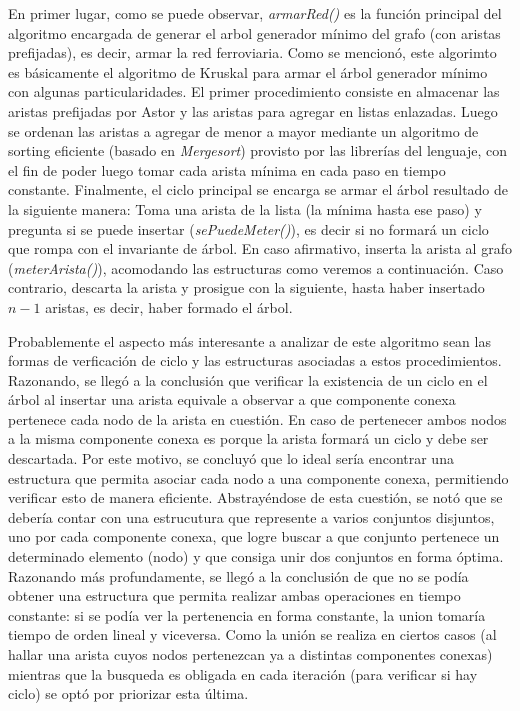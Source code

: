 \documentclass[a4paper,11pt] {article}
\begin{document}
En primer lugar, como se puede observar, \textit{armarRed()} es la función principal del algoritmo encargada de generar el arbol generador mínimo del grafo (con aristas prefijadas), es decir, armar la red ferroviaria. Como se mencionó, este algorimto es básicamente el algoritmo de Kruskal para armar el árbol generador mínimo con algunas particularidades. El primer procedimiento consiste en almacenar las aristas prefijadas por Astor y las aristas para agregar en listas enlazadas. Luego se ordenan las aristas a agregar de menor a mayor mediante un algoritmo de sorting eficiente (basado en \textit{Mergesort}) provisto por las librerías del lenguaje, con el fin de poder luego tomar cada arista mínima en cada paso en tiempo constante. Finalmente, el ciclo principal se encarga se armar el árbol resultado de la siguiente manera: Toma una arista de la lista (la mínima hasta ese paso) y pregunta si se puede insertar (\textit{sePuedeMeter()}), es decir si no formará un ciclo que rompa con el invariante de árbol. En caso afirmativo, inserta la arista al grafo (\textit{meterArista()}), acomodando las estructuras como veremos a continuación. Caso contrario, descarta la arista y prosigue con la siguiente, hasta haber insertado $n-1$ aristas, es decir, haber formado el árbol.

Probablemente el aspecto más interesante a analizar de este algoritmo sean las formas de verficación de ciclo y las estructuras asociadas a estos procedimientos. Razonando, se llegó a la conclusión que verificar la existencia de un ciclo en el árbol al insertar una arista equivale a observar a que componente conexa pertenece cada nodo de la arista en cuestión. En caso de pertenecer ambos nodos a la misma componente conexa es porque la arista formará un ciclo y debe ser descartada. Por este motivo, se concluyó que lo ideal sería encontrar una estructura que permita asociar cada nodo a una componente conexa, permitiendo verificar esto de manera eficiente. Abstrayéndose de esta cuestión, se notó que se debería contar con una estrucutura que represente a varios conjuntos disjuntos, uno por cada componente conexa, que logre buscar a que conjunto pertenece un determinado elemento (nodo) y que consiga unir dos conjuntos en forma óptima. Razonando más profundamente, se llegó a la conclusión de que no se podía obtener una estructura que permita realizar ambas operaciones en tiempo constante: si se podía ver la pertenencia en forma constante, la union tomaría tiempo de orden lineal y viceversa. Como la unión se realiza en ciertos casos (al hallar una arista cuyos nodos pertenezcan ya a distintas componentes conexas) mientras que la busqueda es obligada en cada iteración (para verificar si hay ciclo) se optó por priorizar esta última.
\end{document}
